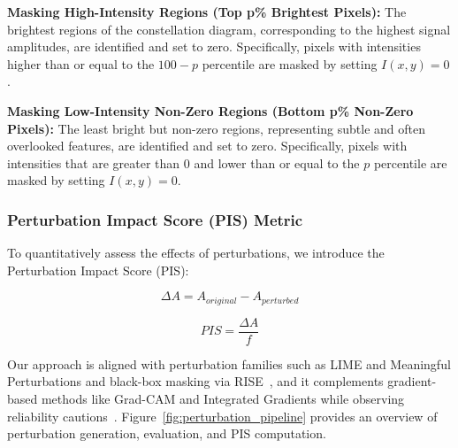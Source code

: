 \documentclass{ELSP}
\begin{document}
\textbf{Masking High-Intensity Regions (Top p\% Brightest Pixels):} The brightest regions of the constellation diagram, corresponding to the highest signal amplitudes, are identified and set to zero. Specifically, pixels with intensities higher than or equal to the $100-p$ percentile are masked by setting $I(x,y) = 0$.

\textbf{Masking Low-Intensity Non-Zero Regions (Bottom p\% Non-Zero Pixels):} The least bright but non-zero regions, representing subtle and often overlooked features, are identified and set to zero. Specifically, pixels with intensities that are greater than 0 and lower than or equal to the $p$ percentile are masked by setting $I(x,y) = 0$.

\subsubsection{Perturbation Impact Score (PIS) Metric}

To quantitatively assess the effects of perturbations, we introduce the Perturbation Impact Score (PIS):

\begin{equation}
\Delta A = A_{original} - A_{perturbed}
\end{equation}

\begin{equation}
PIS = \frac{\Delta A}{f}
\end{equation}

Our approach is aligned with perturbation families such as LIME and Meaningful Perturbations and black-box masking via RISE~\cite{ribeiro2016lime,fong2017meaningful,petsiuk2018rise}, and it complements gradient-based methods like Grad-CAM and Integrated Gradients while observing reliability cautions~\cite{selvaraju2017grad,sundararajan2017ig,adebayo2018sanity,hooker2019roar}.
Figure~\ref{fig:perturbation_pipeline} provides an overview of perturbation generation, evaluation, and PIS computation.
\end{document}
